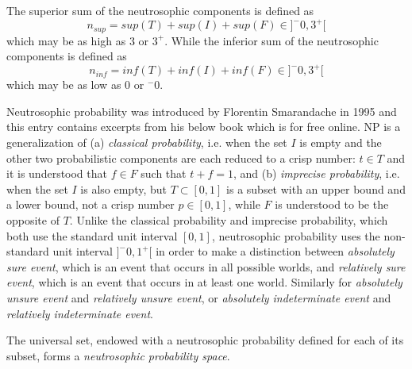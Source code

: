 \documentclass[12pt]{article}
\begin{document}
The superior sum of the neutrosophic components is defined as 
$$n_{sup} = sup(T) + sup(I) + sup(F) \in ] ^-0, 3^+[$$
which may be as high as 3 or $3^+$. 
\newline While the inferior sum of the neutrosophic components is defined as 
$$n_{inf} = inf(T) + inf(I) + inf(F) \in ] ^-0, 3^+[$$
\newline which may be as low as 0 or $^-0$.  

Neutrosophic probability was introduced by Florentin Smarandache in 1995 and this entry contains excerpts from his below book which is for free online.
\newline NP is a generalization of (a) \emph{classical probability}, i.e. when the set $I$ is empty and the other two probabilistic components are each reduced to a crisp number: $t \in T$ and it is understood that $f \in F$ such that $t+f = 1$, and (b) \emph{imprecise probability}, i.e.  when the set $I$ is also empty, but $T \subset [0, 1]$ is a subset with an upper bound and a lower bound, not a crisp number $p \in [0, 1]$, while $F$ is understood to be the opposite of $T$.
\newline Unlike the classical probability and imprecise probability, which both use the standard unit interval $[0, 1]$, neutrosophic probability uses the non-standard unit interval $]^-0, 1^+[$ in order to make a distinction between \emph{absolutely sure event}, which is an event that occurs in all possible worlds, and \emph{relatively sure event}, which is an event that occurs in at least one world.  Similarly for \emph {absolutely unsure event} and \emph {relatively unsure event}, or \emph {absolutely indeterminate event} and \emph {relatively indeterminate event}.

The universal set, endowed with a neutrosophic probability defined for each of its subset, forms a \emph{neutrosophic probability space}. 
\end{document}
